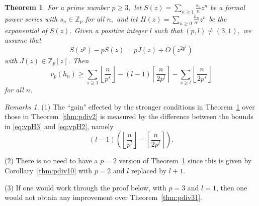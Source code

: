\documentclass[12pt,reqno]{amsart}
\numberwithin{equation}{section}
\newtheorem{theorem}{Theorem}
\theoremstyle{remark}
\newtheorem*{remarks}{Remarks}
\begin{document}
\begin{theorem} \label{thm:pdiv3}
For a prime number $p\ge3,$
let\/ $S(z)=\sum_{n\ge1}\frac {s_n} {n}z^n$ be a formal power series
with $s_n\in{\mathbb{Z}}_p$ for all $n,$ and let 
$H(z)=\sum_{n\ge0}\frac {h_n} {n!}z^n$ be the exponential of $S(z)$.
Given a positive integer $l$
such that $(p,l)\ne(3,1),$ we assume that
\begin{equation} \label{eq:pS3}
S(z^{p})-pS(z)=pJ(z)
+O\left(z^{2p^{l}}\right) 
\end{equation}
with $J(z)\in {\mathbb{Z}}_p[z]$.
Then
\begin{equation} \label{eq:vpH3}
v_p(h_n)\ge \sum_{s \ge 1}{\left\lfloor{\frac {n} {p^{s}}}\right\rfloor}
-(l-1){\left\lceil{\frac {n} {2p^l}}\right\rceil}
-\sum_{s \ge l}{\left\lfloor{\frac {n} {2p^{s}}}\right\rfloor} 
\end{equation}
for all $n$.
\end{theorem}

\begin{remarks}
(1) The ``gain" effected by the stronger conditions in
  Theorem~\ref{thm:pdiv3} over those in Theorem~\ref{thm:pdiv2} is measured
by the difference between the bounds in \eqref{eq:vpH3} and
\eqref{eq:vpH2}, namely
$$
(l-1)\left({\left\lfloor{\frac {n} {p^l}}\right\rfloor}-{\left\lceil{\frac {n} {2p^l}}\right\rceil}\right).
$$

\medskip
(2) There is no need to have a $p=2$ version of
  Theorem~\ref{thm:pdiv3} since this is given by
  Corollary~\ref{thm:pdiv10} with $p=2$ and $l$ replaced by $l+1$.

\medskip
(3) If one would work through the proof below, with $p=3$ and
$l=1$, then one would not obtain any improvement over Theorem~\ref{thm:pdiv31}.
\end{remarks}
\end{document}
